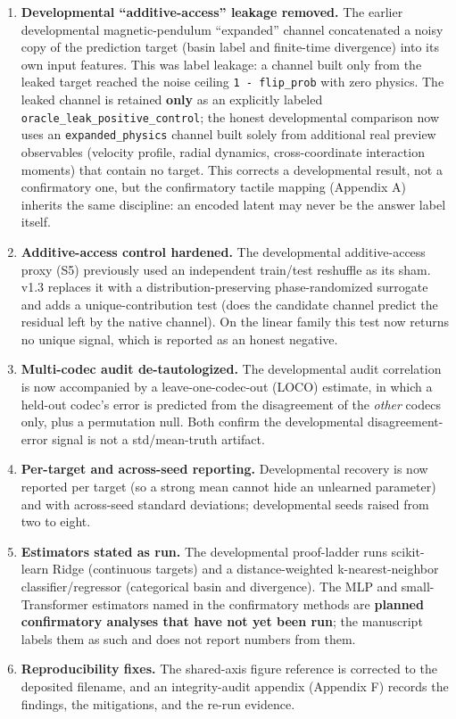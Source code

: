 \documentclass[
  11pt,
]{article}
\providecommand{\tightlist}{%
  \setlength{\itemsep}{0pt}\setlength{\parskip}{0pt}}
\begin{document}
\begin{enumerate}
\def\labelenumi{\arabic{enumi}.}
\tightlist
\item
  \textbf{Developmental ``additive-access''
  leakage removed.} The earlier developmental
  magnetic-pendulum ``expanded'' channel
  concatenated a noisy copy of the prediction
  target (basin label and finite-time
  divergence) into its own input features. This
  was label leakage: a channel built only from
  the leaked target reached the noise ceiling
  \texttt{1\ -\ flip\_prob} with zero physics.
  The leaked channel is retained \textbf{only}
  as an explicitly labeled
  \texttt{oracle\_leak\_positive\_control}; the
  honest developmental comparison now uses an
  \texttt{expanded\_physics} channel built
  solely from additional real preview
  observables (velocity profile, radial
  dynamics, cross-coordinate interaction
  moments) that contain no target. This corrects
  a developmental result, not a confirmatory
  one, but the confirmatory tactile mapping
  (Appendix A) inherits the same discipline: an
  encoded latent may never be the answer label
  itself.
\item
  \textbf{Additive-access control hardened.} The
  developmental additive-access proxy (S5)
  previously used an independent train/test
  reshuffle as its sham. v1.3 replaces it with a
  distribution-preserving phase-randomized
  surrogate and adds a unique-contribution test
  (does the candidate channel predict the
  residual left by the native channel). On the
  linear family this test now returns no unique
  signal, which is reported as an honest
  negative.
\item
  \textbf{Multi-codec audit de-tautologized.}
  The developmental audit correlation is now
  accompanied by a leave-one-codec-out (LOCO)
  estimate, in which a held-out codec's error is
  predicted from the disagreement of the
  \emph{other} codecs only, plus a permutation
  null. Both confirm the developmental
  disagreement-error signal is not a
  std/\textbar mean-truth\textbar{} artifact.
\item
  \textbf{Per-target and across-seed reporting.}
  Developmental recovery is now reported per
  target (so a strong mean cannot hide an
  unlearned parameter) and with across-seed
  standard deviations; developmental seeds
  raised from two to eight.
\item
  \textbf{Estimators stated as run.} The
  developmental proof-ladder runs scikit-learn
  Ridge (continuous targets) and a
  distance-weighted k-nearest-neighbor
  classifier/regressor (categorical basin and
  divergence). The MLP and small-Transformer
  estimators named in the confirmatory methods
  are \textbf{planned confirmatory analyses that
  have not yet been run}; the manuscript labels
  them as such and does not report numbers from
  them.
\item
  \textbf{Reproducibility fixes.} The
  shared-axis figure reference is corrected to
  the deposited filename, and an integrity-audit
  appendix (Appendix F) records the findings,
  the mitigations, and the re-run evidence.
\end{enumerate}
\end{document}
